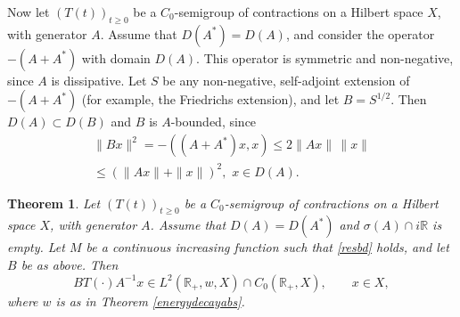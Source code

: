 \documentclass[11pt]{amsart}
\newtheorem{theorem}{Theorem}[section]
\theoremstyle{definition}
\theoremstyle{remark}
\numberwithin{equation}{section}
\begin{document}
Now let $(T(t))_{t\ge0}$ be a $C_0$-semigroup of contractions on a Hilbert space $X$, with generator $A$.  Assume that $D(A^*) = D(A)$, and consider the operator $-(A+A^*)$ with domain $D(A)$.  This operator is symmetric and non-negative, since $A$ is dissipative.  Let $S$ be any non-negative, self-adjoint extension of $-(A+A^*)$ (for example, the Friedrichs extension), and let $B = S^{1/2}$.  Then $D(A) \subset D(B)$ and $B$ is $A$-bounded, since
\begin{multline} \label{BAbd}
\|Bx\|^2 = - ( (A+A^*)x,x ) \le 2 \|Ax\| \, \|x\| \\ \le (\|Ax\| + \|x\|)^2, \,\, x \in D(A).
\end{multline}

\begin{theorem} \label{Hilbert}
Let $(T(t))_{t \ge0}$ be a $C_0$-semigroup of contractions on a Hilbert space $X$, with generator $A$.  Assume that $D(A) = D(A^*)$ and $\sigma(A) \cap i{{\mathbb R}}$ is empty. Let $M$ be a continuous increasing function such that \eqref{resbd} holds, and let $B$ be as above.  Then
\[
B T(\cdot) A^{-1}x \in L^2({{\mathbb R}}_+,w,X) \cap C_0({{\mathbb R}}_+,X),  \qquad x \in X,
\]
where $w$ is as in Theorem \ref{energydecayabs}.
\end{theorem}
\end{document}
